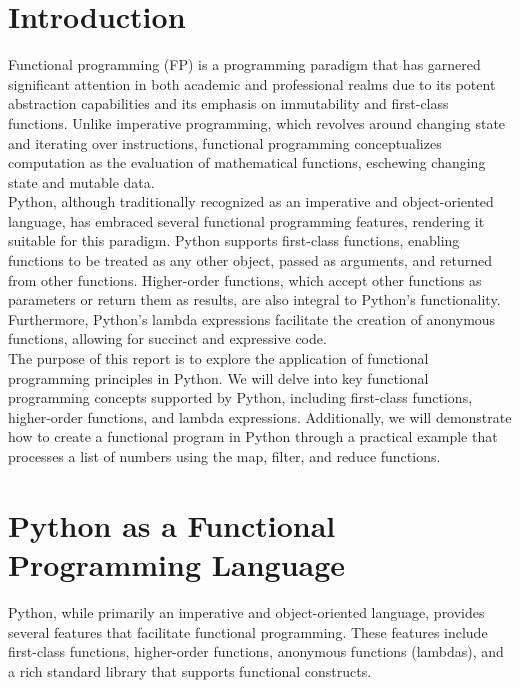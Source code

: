 \documentclass[a4paper]{article}
\begin{document}
\tableofcontents
\newpage

\section{Introduction}
Functional programming (FP) is a programming paradigm that has garnered significant attention in both academic and professional realms due to its potent abstraction capabilities and its emphasis on immutability and first-class functions. Unlike imperative programming, which revolves around changing state and iterating over instructions, functional programming conceptualizes computation as the evaluation of mathematical functions, eschewing changing state and mutable data.\\

Python, although traditionally recognized as an imperative and object-oriented language, has embraced several functional programming features, rendering it suitable for this paradigm. Python supports first-class functions, enabling functions to be treated as any other object, passed as arguments, and returned from other functions. Higher-order functions, which accept other functions as parameters or return them as results, are also integral to Python's functionality. Furthermore, Python's lambda expressions facilitate the creation of anonymous functions, allowing for succinct and expressive code.\\

The purpose of this report is to explore the application of functional programming principles in Python. We will delve into key functional programming concepts supported by Python, including first-class functions, higher-order functions, and lambda expressions. Additionally, we will demonstrate how to create a functional program in Python through a practical example that processes a list of numbers using the map, filter, and reduce functions.\\

\newpage

\section{Python as a Functional Programming Language}
Python, while primarily an imperative and object-oriented language, provides several features that facilitate functional programming. These features include first-class functions, higher-order functions, anonymous functions (lambdas), and a rich standard library that supports functional constructs.\\
\end{document}
